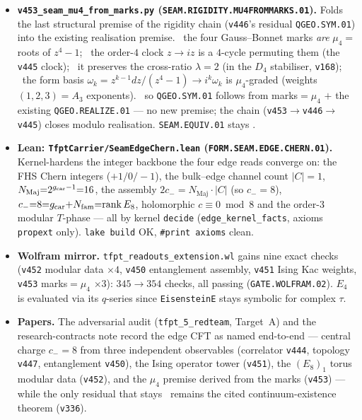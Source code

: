 \begin{itemize}
signature, extending \texttt{v156}'s $q$-expansion to the transformation data. \mE\ the character
$\chi{=}E_4/\eta^8$ is $S$-invariant $\chi(-1/\tau){=}\chi(\tau)$ (one primary, $S{=}[1]$); \mE\ $T$-phase
$\chi(\tau{+}1)/\chi(\tau){=}e^{-2\pi i/3}{=}e^{-2\pi i c/24}$ ($c{=}8$); \mE\ leading power $\chi\,q^{1/3}\to1$ so
$q^{-c/24}{=}q^{-1/3}\Rightarrow c{=}8$; \mE\ holomorphic $c{=}8\equiv0\bmod8$ with $T$-phase order
$24/\gcd(8,24){=}3$. \mC\ the $(E_8)_1$ identity is now pinned on the torus \emph{and} the edge. \texttt{SEAM.EQUIV.01}
stays \mO.
\item \textbf{\texttt{v453\_seam\_mu4\_from\_marks.py} (\texttt{SEAM.RIGIDITY.MU4FROMMARKS.01}).} Folds the last
structural premise of the rigidity chain (\texttt{v446}'s residual \texttt{QGEO.SYM.01}) into the existing
realisation premise. \mE\ the four Gauss--Bonnet marks \emph{are} $\mu_4{=}$ roots of $z^4{-}1$; \mE\ the order-$4$
clock $z\!\to\!iz$ is a $4$-cycle permuting them (the \texttt{v445} clock); \mE\ it preserves the cross-ratio
$\lambda{=}2$ (in the $D_4$ stabiliser, \texttt{v168}); \mE\ the form basis $\omega_k{=}z^{k-1}dz/(z^4{-}1)\to
i^k\omega_k$ is $\mu_4$-graded (weights $(1,2,3){=}A_3$ exponents). \mC\ so \texttt{QGEO.SYM.01} follows from
marks$=\mu_4$ $+$ the existing \texttt{QGEO.REALIZE.01} --- no new premise; the chain
(\texttt{v453}$\to$\texttt{v446}$\to$\texttt{v445}) closes modulo realisation. \texttt{SEAM.EQUIV.01} stays \mO.
\item \textbf{Lean: \texttt{TfptCarrier/SeamEdgeChern.lean} (\texttt{FORM.SEAM.EDGE.CHERN.01}).} Kernel-hardens the
integer backbone the four edge reads converge on: the FHS Chern integers ($+1/0/-1$), the bulk--edge channel count
$|C|{=}1$, $N_{\mathrm{Maj}}{=}2^{g_{\mathrm{car}}-1}{=}16$, the assembly $2c_-{=}N_{\mathrm{Maj}}\cdot|C|$ (so $c_-{=}8$),
$c_-{=}8{=}g_{\mathrm{car}}{+}N_{\mathrm{fam}}{=}\mathrm{rank}\,E_8$, holomorphic $c\equiv0\bmod8$ and the order-$3$ modular $T$-phase ---
all by kernel \texttt{decide} (\texttt{edge\_kernel\_facts}, axioms \texttt{propext} only). \texttt{lake build} OK,
\texttt{\#print axioms} clean.
\item \textbf{Wolfram mirror.} \texttt{tfpt\_readouts\_extension.wl} gains nine exact checks (\texttt{v452} modular
data $\times4$, \texttt{v450} entanglement assembly, \texttt{v451} Ising Kac weights, \texttt{v453} marks$=\mu_4$
$\times3$): $345\to354$ checks, all passing (\texttt{GATE.WOLFRAM.02}). $E_4$ is evaluated via its $q$-series since
\texttt{EisensteinE} stays symbolic for complex $\tau$.
\item \textbf{Papers.} The adversarial audit (\texttt{tfpt\_5\_redteam}, Target~A) and the research-contracts note
record the edge CFT as named end-to-end --- central charge $c_-{=}8$ from three independent observables (correlator
\texttt{v444}, topology \texttt{v447}, entanglement \texttt{v450}), the Ising operator tower (\texttt{v451}), the
$(E_8)_1$ torus modular data (\texttt{v452}), and the $\mu_4$ premise derived from the marks (\texttt{v453}) --- while
the only residual that stays \mO\ remains the cited continuum-existence theorem (\texttt{v336}).
\end{itemize}

